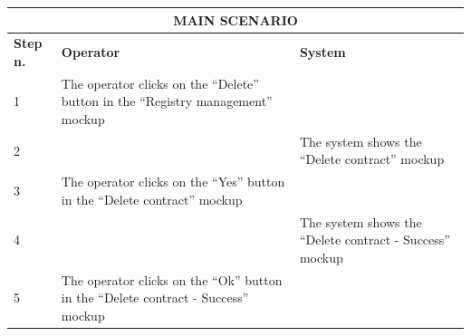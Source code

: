 {{{\begin{center}
			\begin{tabular}{|p{2cm}|p{6cm}|p{6cm}|}
			\hline
				\multicolumn{3}{|c|}{MAIN SCENARIO} \\
			\hline
				\vspace{1mm} \bfseries{Step n.} \vspace{1mm} &
				\vspace{1mm} \bfseries{Operator} \vspace{1mm} & 
				\vspace{1mm} \bfseries{System} \vspace{1mm}\\
			\hline
				\vspace{1mm} 1 \vspace{1mm} &
				\vspace{1mm} The operator clicks on the “Delete”  button  in the “Registry management”  mockup \vspace{1mm} & 
				\vspace{1mm} \vspace{1mm} \\
			\hline
				\vspace{1mm} 2 \vspace{1mm} &
				\vspace{1mm} \vspace{1mm} & 
				\vspace{1mm} The system shows the “Delete contract”  mockup \vspace{1mm} \\
			\hline
				\vspace{1mm} 3 \vspace{1mm} &
				\vspace{1mm} The operator clicks on the “Yes”  button  in the “Delete contract”  mockup \vspace{1mm} & 
				\vspace{1mm} \vspace{1mm} \\
			\hline
				\vspace{1mm} 4 \vspace{1mm} &
				\vspace{1mm} \vspace{1mm} & 
				\vspace{1mm} The system shows the “Delete contract - Success”  mockup \vspace{1mm} \\
			\hline
				\vspace{1mm} 5 \vspace{1mm} &
				\vspace{1mm} The operator clicks on the “Ok”  button  in the “Delete contract - Success”  mockup\vspace{1mm} & 

\end{tabular}
\end{center}}}}
